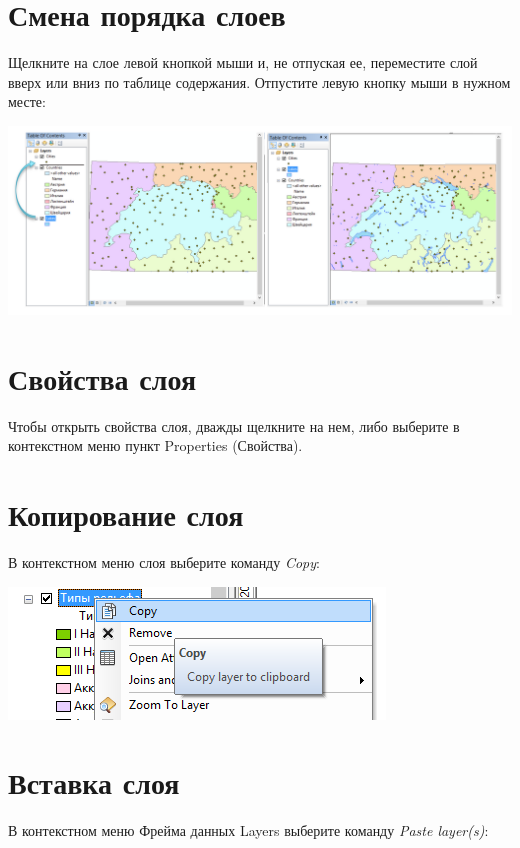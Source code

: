 \documentclass[]{book}
\theoremstyle{definition}
\theoremstyle{definition}
\theoremstyle{definition}
\theoremstyle{remark}
\begin{document}
\hypertarget{--}{%
\section{Смена порядка слоев}\label{--}}

Щелкните на слое левой кнопкой мыши и, не отпуская ее, переместите слой
вверх или вниз по таблице содержания. Отпустите левую кнопку мыши в
нужном месте:

\includegraphics{images/Appendix/image10.png}

\hypertarget{-}{%
\section{Свойства слоя}\label{-}}

Чтобы открыть свойства слоя, дважды щелкните на нем, либо выберите в
контекстном меню пункт Properties (Свойства).

\hypertarget{-}{%
\section{Копирование слоя}\label{-}}

В контекстном меню слоя выберите команду \emph{Copy}:

\includegraphics{images/Appendix/image11.png}

\hypertarget{-}{%
\section{Вставка слоя}\label{-}}

В контекстном меню Фрейма данных Layers выберите команду \emph{Paste
layer(s)}:
\end{document}
